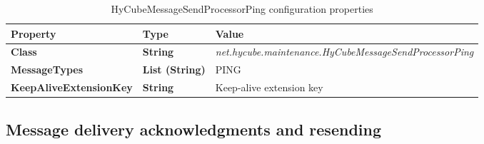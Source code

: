 \begin{table}
\scriptsize
\begin{center}
\begin{tabular}{p{4.5cm} p{1.5cm} p{8.5cm}}
	\hline
	\textbf{Property}							& \textbf{Type}					& \textbf{Value}					\\[1mm]
    \hline
	\textbf{Class}								& \textbf{String}				& \textit{net.hycube.maintenance.HyCubeMessageSendProcessorPing}								\\[1.5mm]	
	\textbf{MessageTypes}						& \textbf{List (String)}		& PING																				\\[1.5mm]	
	\textbf{KeepAliveExtensionKey}				& \textbf{String}				& Keep-alive extension key																				\\[1.5mm]	
    \hline
\end{tabular}
\end{center}
\caption{HyCubeMessageSendProcessorPing configuration properties}
\label{tab:libHyCubeMessageSendProcessorPing}
\end{table}










\subsection{Message delivery acknowledgments and resending}

